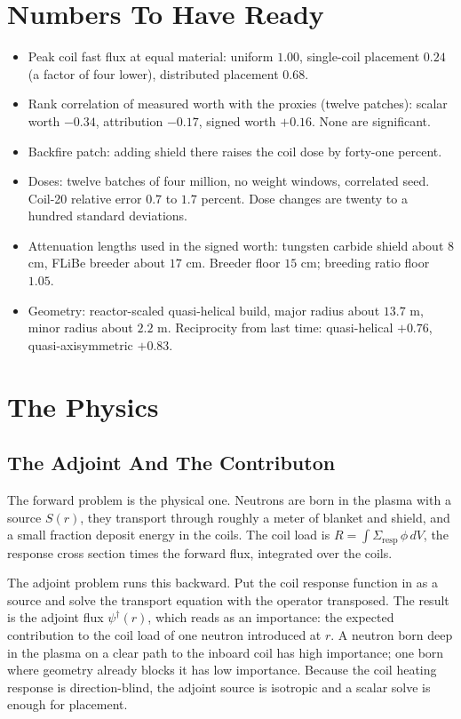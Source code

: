 \documentclass[11pt]{article}
\begin{document}
\section{Numbers To Have Ready}
\begin{itemize}
  \item Peak coil fast flux at equal material: uniform $1.00$, single-coil placement $0.24$
        (a factor of four lower), distributed placement $0.68$.
  \item Rank correlation of measured worth with the proxies (twelve patches): scalar worth $-0.34$,
        attribution $-0.17$, signed worth $+0.16$. None are significant.
  \item Backfire patch: adding shield there raises the coil dose by forty-one percent.
  \item Doses: twelve batches of four million, no weight windows, correlated seed. Coil-20 relative
        error $0.7$ to $1.7$ percent. Dose changes are twenty to a hundred standard deviations.
  \item Attenuation lengths used in the signed worth: tungsten carbide shield about $8$ cm, FLiBe
        breeder about $17$ cm. Breeder floor $15$ cm; breeding ratio floor $1.05$.
  \item Geometry: reactor-scaled quasi-helical build, major radius about $13.7$ m, minor radius
        about $2.2$ m. Reciprocity from last time: quasi-helical $+0.76$, quasi-axisymmetric $+0.83$.
\end{itemize}

\section{The Physics}

\subsection{The Adjoint And The Contributon}
The forward problem is the physical one. Neutrons are born in the plasma with a source $S(r)$, they
transport through roughly a meter of blanket and shield, and a small fraction deposit energy in the
coils. The coil load is $R=\int \Sigma_{\mathrm{resp}}\,\phi\,dV$, the response cross section times
the forward flux, integrated over the coils.

The adjoint problem runs this backward. Put the coil response function in as a source and solve the
transport equation with the operator transposed. The result is the adjoint flux $\psi^\dagger(r)$,
which reads as an importance: the expected contribution to the coil load of one neutron introduced at
$r$. A neutron born deep in the plasma on a clear path to the inboard coil has high importance; one
born where geometry already blocks it has low importance. Because the coil heating response is
direction-blind, the adjoint source is isotropic and a scalar solve is enough for placement.
\end{document}

